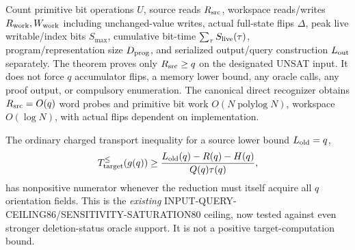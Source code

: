 \documentclass[11pt]{article}
\begin{document}
Count primitive bit operations \(U\), source reads \(R_{\rm src}\), workspace reads/writes \(R_{\rm work},W_{\rm work}\) including unchanged-value writes, actual full-state flips \(\Delta\), peak live writable/index bits \(S_{\max}\), cumulative bit-time \(\sum_\tau S_{\rm live}(\tau)\), program/representation size \(D_{\rm prog}\), and serialized output/query construction \(L_{\rm out}\) separately. The theorem proves only \(R_{\rm src}\ge q\) on the designated UNSAT input. It does not force \(q\) accumulator flips, a memory lower bound, any oracle calls, any proof output, or compulsory enumeration. The canonical direct recognizer obtains \(R_{\rm src}=O(q)\) word probes and primitive bit work \(O(N\operatorname{polylog}N)\), workspace \(O(\log N)\), with actual flips dependent on implementation.

The ordinary charged transport inequality for a source lower bound \(L_{\rm old}=q\),
\[
T_{\rm target}^{\le}(g(q))\ge
\frac{L_{\rm old}(q)-R(q)-H(q)}{Q(q)\tau(q)},
\]
has nonpositive numerator whenever the reduction must itself acquire all \(q\) orientation fields. This is the \emph{existing} INPUT-QUERY-CEILING86/SENSITIVITY-SATURATION80 ceiling, now tested against even stronger deletion-status oracle support. It is not a positive target-computation bound.
\end{document}
